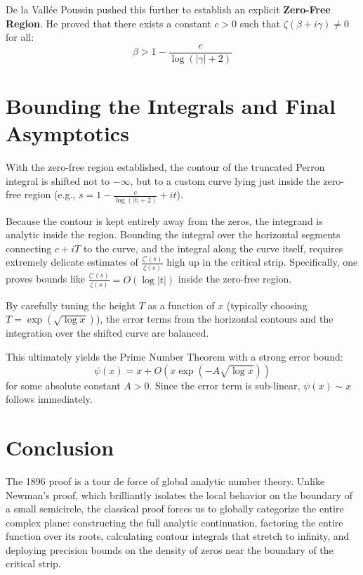 \documentclass[12pt]{article}
\begin{document}
De la Vall\'ee Poussin pushed this further to establish an explicit \textbf{Zero-Free Region}. He proved that there exists a constant $c > 0$ such that $\zeta(\beta + i\gamma) \neq 0$ for all:
\[ \beta > 1 - \frac{c}{\log(|\gamma| + 2)} \]

\section{Bounding the Integrals and Final Asymptotics}
With the zero-free region established, the contour of the truncated Perron integral is shifted not to $-\infty$, but to a custom curve lying just inside the zero-free region (e.g., $s = 1 - \frac{c}{\log(|t|+2)} + it$).

Because the contour is kept entirely away from the zeros, the integrand is analytic inside the region. Bounding the integral over the horizontal segments connecting $c+iT$ to the curve, and the integral along the curve itself, requires extremely delicate estimates of $\frac{\zeta'(s)}{\zeta(s)}$ high up in the critical strip. Specifically, one proves bounds like $\frac{\zeta'(s)}{\zeta(s)} = O(\log |t|)$ inside the zero-free region.

By carefully tuning the height $T$ as a function of $x$ (typically choosing $T = \exp(\sqrt{\log x})$), the error terms from the horizontal contours and the integration over the shifted curve are balanced. 

This ultimately yields the Prime Number Theorem with a strong error bound:
\[ \psi(x) = x + O\left(x \exp(-A \sqrt{\log x})\right) \]
for some absolute constant $A > 0$. Since the error term is sub-linear, $\psi(x) \sim x$ follows immediately. 

\section{Conclusion}
The 1896 proof is a tour de force of global analytic number theory. Unlike Newman's proof, which brilliantly isolates the local behavior on the boundary of a small semicircle, the classical proof forces us to globally categorize the entire complex plane: constructing the full analytic continuation, factoring the entire function over its roots, calculating contour integrals that stretch to infinity, and deploying precision bounds on the density of zeros near the boundary of the critical strip.
\end{document}
